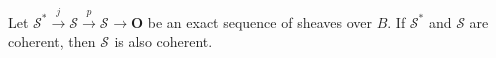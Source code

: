 Let $\mathcal{S}^* \xrightarrow{j} \mathcal{S} \xrightarrow{p} \mathcal{S}^{} \rightarrow \mathbf{O}$ be an exact sequence of sheaves over $B$. If $\mathcal{S}^*$ and $\mathcal{S}$ are coherent, then $\mathcal{S}^{}$ is also coherent.
